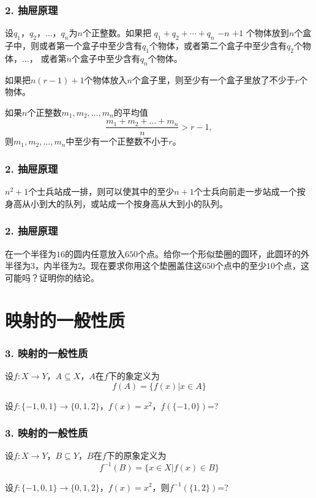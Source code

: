 \documentclass{beamer}
\begin{document}
\begin{CJK*}{UTF8}{gbsn}
\begin{frame}
  \frametitle{2. 抽屉原理}
  \begin{Thm}[抽屉原理的强形式]
    设$q_1$，$q_2$，$\ldots$，$q_n$为$n$个正整数。如果把 $q_1 + q_2 + \cdots + q_n$  $- n$ $ + 1$ 个物体放到$n$个盒子中，则或者第一个盒子中至少含有$q_1$个物体，或者第二个盒子中至少含有$q_2$个物体，$\ldots$，
    或者第$n$个盒子中至少含有$q_n$个物体。
  \end{Thm}\pause
  \begin{Cor}
    如果把$n(r-1) + 1$个物体放入$n$个盒子里，则至少有一个盒子里放了不少于$r$个物体。
  \end{Cor}\pause
  \begin{Cor}
    如果$n$个正整数$m_1, m_2, \ldots, m_n$的平均值\[\frac{m_1 + m_2 + \ldots + m_n}{n} > r - 1,\] 则$m_1, m_2, \ldots, m_n$中至少有一个正整数不小于$r$。
  \end{Cor}
\end{frame}

\begin{frame}
    \frametitle{2. 抽屉原理}
  \begin{Ex}
    $n^2+1$个士兵站成一排，则可以使其中的至少$n+1$个士兵向前走一步站成一个按身高从小到大的队列，或站成一个按身高从大到小的队列。
  \end{Ex}
  
\end{frame}
\begin{frame}
  \frametitle{2. 抽屉原理}
  \begin{Exercise}
    在一个半径为$16$的圆内任意放入$650$个点。给你一个形似垫圈的圆环，此圆环的外半径为$3$，内半径为$2$。现在要求你用这个垫圈盖住这$650$个点中的至少$10$个点，这可能吗？证明你的结论。
  \end{Exercise}
\end{frame}
\section{映射的一般性质}
\begin{frame}
  \frametitle{3. 映射的一般性质}
  \begin{Def}
    设$f:X\to Y$，$A \subseteq X$，$A$在$f$下的\alert{象}定义为\[f(A)=\{f(x)|x\in A\}\]
  \end{Def}\pause
  \begin{Ex}
    设$f:\{-1,0,1\}\to \{0,1,2\}$，$f(x)=x^2$，$f(\{-1,0\})$=?
  \end{Ex}
\end{frame}
\begin{frame}
  \frametitle{3. 映射的一般性质}
  \begin{Def}
    设$f:X\to Y$，$B \subseteq Y$，$B$在$f$下的\alert{原象}定义为\[f^{-1}(B)=\{x\in X|f(x)\in B\}\]
  \end{Def}\pause
  \begin{Ex}
    设$f:\{-1,0,1\}\to \{0,1,2\}$，$f(x)=x^2$，则$f^{-1}(\{1,2\})$=?
  \end{Ex}
\end{frame}


\end{CJK*}
\end{document}
